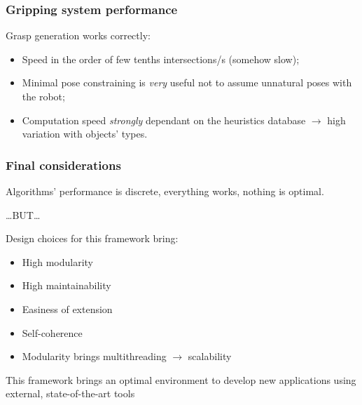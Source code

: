 \documentclass{beamer}
\begin{document}
  \begin{frame}
    \frametitle{Gripping system performance}
    Grasp generation works correctly:

    \begin{itemize}
    \item{Speed in the order of few tenths intersections/s (somehow slow);}
    \item{Minimal pose constraining is \emph{very} useful not to
      assume unnatural poses with the robot;}
    \item{Computation speed \emph{strongly} dependant on the
      heuristics database $\rightarrow$ high variation with objects' types.}
    \end{itemize}

  \end{frame}

  \begin{frame}
    \frametitle{Final considerations}
    Algorithms' performance is discrete, everything works, nothing is
    optimal.
    
    \pause
    \dots BUT\dots
    \pause

    Design choices for this framework bring:
    \begin{itemize}
    \item{High modularity}
    \item{High maintainability}
    \item{Easiness of extension}
    \item{Self-coherence}
    \item{Modularity brings multithreading $\rightarrow$
      scalability}
    \end{itemize}
    \pause
    \alert{This framework brings an optimal environment to develop
      new applications using external, state-of-the-art tools}
  \end{frame}
\end{document}
